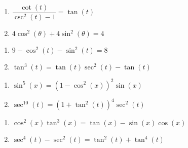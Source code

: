 \documentclass{ximera}
\begin{document}
\begin{multicols}{2}

\begin{enumerate}

\setcounter{enumi}{\value{HW}}

\item   $\dfrac{\cot(t)}{\csc^{2}(t) - 1} = \tan(t)$
\item $4 \cos^{2}(\theta) + 4 \sin^{2}(\theta) = 4$

\setcounter{HW}{\value{enumi}}

\end{enumerate}

\end{multicols}

\begin{multicols}{2}

\begin{enumerate}

\setcounter{enumi}{\value{HW}}

\item $9 - \cos^{2}(t) - \sin^{2}(t) = 8$
\item $\tan^{3}(t) = \tan(t)\sec^{2}(t) - \tan(t)$

\setcounter{HW}{\value{enumi}}

\end{enumerate}

\end{multicols}

\begin{multicols}{2}

\begin{enumerate}

\setcounter{enumi}{\value{HW}}

\item $\sin^{5}(x) = \left(1-\cos^{2}(x)\right)^{2} \sin(x)$
\item $\sec^{10}(t) = \left(1 + \tan^{2}(t)\right)^4 \sec^{2}(t)$

\setcounter{HW}{\value{enumi}}

\end{enumerate}

\end{multicols}

\begin{multicols}{2}

\begin{enumerate}

\setcounter{enumi}{\value{HW}}

\item $\cos^{2}(x)\tan^{3}(x) = \tan(x) - \sin(x)\cos(x)$
\item $\sec^{4}(t) - \sec^{2}(t) = \tan^{2}(t) + \tan^{4}(t)$

\setcounter{HW}{\value{enumi}}

\end{enumerate}

\end{multicols}
\end{document}
